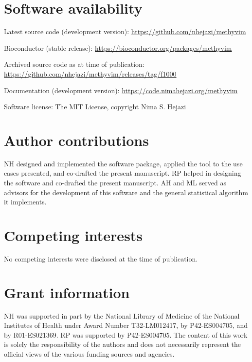 \documentclass[9pt,a4paper,]{extarticle}
\theoremstyle{definition}
\theoremstyle{definition}
\theoremstyle{definition}
\theoremstyle{remark}
\begin{document}
\hypertarget{software-availability}{%
\section{Software availability}\label{software-availability}}

Latest source code (development version): \url{https://github.com/nhejazi/methyvim}

Bioconductor (stable release): \url{https://bioconductor.org/packages/methyvim}

Archived source code as at time of publication:
\url{https://github.com/nhejazi/methyvim/releases/tag/f1000}

Documentation (development version): \url{https://code.nimahejazi.org/methyvim}

Software license: The MIT License, copyright Nima S. Hejazi

\hypertarget{author-contributions}{%
\section{Author contributions}\label{author-contributions}}

NH designed and implemented the software package, applied the tool to the use
cases presented, and co-drafted the present manuscript. RP helped in designing
the software and co-drafted the present manuscript. AH and ML served as advisors
for the development of this software and the general statistical algorithm it
implements.

\hypertarget{competing-interests}{%
\section{Competing interests}\label{competing-interests}}

No competing interests were disclosed at the time of publication.

\hypertarget{grant-information}{%
\section{Grant information}\label{grant-information}}

NH was supported in part by the National Library of Medicine of the National
Institutes of Health under Award Number T32-LM012417, by P42-ES004705, and
by R01-ES021369. RP was supported by P42-ES004705. The content of this work is
solely the responsibility of the authors and does not necessarily represent the
official views of the various funding sources and agencies.

\renewcommand\refname{References}
{\small}
\end{document}
